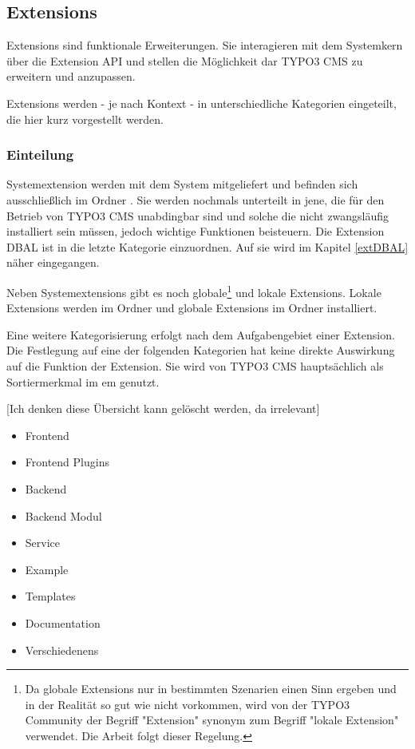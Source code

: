 \subsection{Extensions}
Extensions sind funktionale Erweiterungen. Sie interagieren mit dem Systemkern über die Extension API und stellen die Möglichkeit dar TYPO3 CMS zu erweitern und anzupassen.

Extensions werden - je nach Kontext - in unterschiedliche Kategorien eingeteilt, die hier kurz vorgestellt werden.

\subsubsection{Einteilung}
\label{subsubsec:sysext}
Systemextension werden mit dem System mitgeliefert und befinden sich ausschließlich im Ordner . Sie werden nochmals unterteilt in jene, die für den Betrieb von TYPO3 CMS unabdingbar sind und solche die nicht zwangsläufig installiert sein müssen, jedoch wichtige Funktionen beisteuern. Die Extension DBAL ist in die letzte Kategorie einzuordnen. Auf sie wird im Kapitel \ref{extDBAL} näher eingegangen.

Neben Systemextensions gibt es noch globale\footnote{Da globale Extensions nur in bestimmten Szenarien einen Sinn ergeben und in der Realität so gut wie nicht vorkommen, wird von der TYPO3 Community der Begriff "Extension" synonym zum Begriff "lokale Extension" verwendet. Die Arbeit folgt dieser Regelung.} und lokale Extensions. Lokale Extensions werden im Ordner  und globale Extensions im Ordner  installiert.

Eine weitere Kategorisierung erfolgt nach dem Aufgabengebiet einer Extension. Die Festlegung auf eine der folgenden Kategorien hat keine direkte Auswirkung auf die Funktion der Extension. Sie wird von TYPO3 CMS hauptsächlich als Sortiermerkmal im \gls{em} genutzt.

[Ich denken diese Übersicht kann gelöscht werden, da irrelevant]
\begin{itemize}
	\item
		Frontend
	\item
		Frontend Plugins
	\item
		Backend
	\item
		Backend Modul
	\item
		Service
	\item
		Example
	\item
		Templates
	\item
		Documentation
	\item
		Verschiedenens
\end{itemize}

